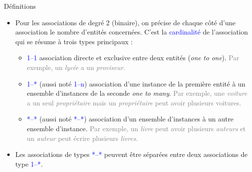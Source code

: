 \documentclass[10pt]{beamer}
\begin{document}
\begin{frame}{\Ctitle}{\stitle}
    \begin{alertblock}{Définitions}
        \begin{itemize}
        \item<2-> Pour les associations de degré 2 (binaire), on précise de chaque côté d'une association le nombre d'entités concernées. C'est la \textcolor{blue}{cardinalité} de l'association qui se résume à trois types principaux :
        \begin{itemize}
            \item<3-> \textcolor{blue}{1--1} association directe et exclusive entre deux entités (\textit{one to one}). 
            \textcolor{gray}{Par exemple, un \textit{lycée} a un \textit{proviseur}.}
            \item<5-> \textcolor{blue}{1--*} (aussi noté \textcolor{blue}{1--n})  association d'une instance de la première entité à un ensemble d'instances de la seconde \textit{one to many}.
            \textcolor{gray}{Par exemple, une \textit{voiture} a un seul \textit{propriétaire} mais un \textit{propriétaire} peut avoir plusieurs voitures.}
            \item<7-> \textcolor{blue}{*--*} (aussi noté \textcolor{blue}{*--*}) association d'un ensemble d'instances à un autre ensemble d'instance. 
            \textcolor{gray}{Par exemple, un \textit{livre} peut avoir plusieurs \textit{auteurs} et un \textit{auteur} peut écrire plusieurs \textit{livres}.}
        \end{itemize}
        \item<9-> Les associations de types \textcolor{blue}{*--*} peuvent être séparées entre deux associations de type \textcolor{blue}{1--*}. 
    \end{itemize}
    \end{alertblock}
\end{frame}
\end{document}
